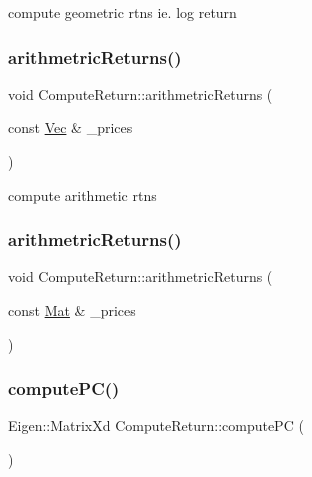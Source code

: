 compute geometric rtns ie. log return 

\hypertarget{classComputeReturn_a3a6c9c21aa99b02dc6f2efd2b32091b8}{}\label{classComputeReturn_a3a6c9c21aa99b02dc6f2efd2b32091b8} 
\subsubsection{\texorpdfstring{arithmetric\+Returns()}{arithmetricReturns()}\hspace{0.1cm}{\footnotesize\ttfamily [1/2]}}
{\footnotesize\ttfamily void Compute\+Return\+::arithmetric\+Returns (\begin{DoxyParamCaption}\item[{const \hyperlink{compute__returns__eigen_8h_a1eb6a9306ef406d7975f3cbf2e247777}{Vec} \&}]{\+\_\+prices }\end{DoxyParamCaption})}



compute arithmetic rtns 

\hypertarget{classComputeReturn_a8c26c2417285e0d00204ac97b16ea05b}{}\label{classComputeReturn_a8c26c2417285e0d00204ac97b16ea05b} 
\subsubsection{\texorpdfstring{arithmetric\+Returns()}{arithmetricReturns()}\hspace{0.1cm}{\footnotesize\ttfamily [2/2]}}
{\footnotesize\ttfamily void Compute\+Return\+::arithmetric\+Returns (\begin{DoxyParamCaption}\item[{const \hyperlink{compute__returns__eigen_8h_ae14dd28696f743e067dbd2594616bad6}{Mat} \&}]{\+\_\+prices }\end{DoxyParamCaption})}

\hypertarget{classComputeReturn_aef7572244a63c71bc4da1467cea38da2}{}\label{classComputeReturn_aef7572244a63c71bc4da1467cea38da2} 
\subsubsection{\texorpdfstring{compute\+P\+C()}{computePC()}}
{\footnotesize\ttfamily Eigen\+::\+Matrix\+Xd Compute\+Return\+::compute\+PC (\begin{DoxyParamCaption}{ }\end{DoxyParamCaption})}



